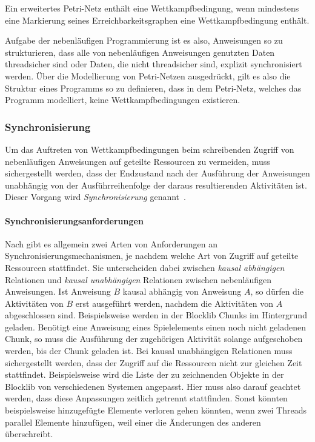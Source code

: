 Ein erweitertes Petri-Netz enthält eine Wettkampfbedingung, wenn mindestens eine Markierung seines Erreichbarkeitsgraphen eine Wettkampfbedingung enthält.

Aufgabe der nebenläufigen Programmierung ist es also, Anweisungen so zu strukturieren, dass alle von nebenläufigen Anweisungen genutzten Daten threadsicher sind oder Daten, die nicht threadsicher sind, explizit synchronisiert werden. Über die Modellierung von Petri-Netzen ausgedrückt, gilt es also die Struktur eines Programms so zu definieren, dass in dem Petri-Netz, welches das Programm modelliert, keine Wettkampfbedingungen existieren.

\subsubsection{Synchronisierung}
Um das Auftreten von Wettkampfbedingungen beim schreibenden Zugriff von nebenläufigen Anweisungen auf geteilte Ressourcen zu vermeiden, muss sichergestellt werden, dass der Endzustand nach der Ausführung der Anweisungen unabhängig von der Ausführreihenfolge der daraus resultierenden Aktivitäten ist. Dieser Vorgang wird \emph{Synchronisierung} genannt~\cite[S.~4]{Maurer2019}.

\paragraph{Synchronisierungsanforderungen} Nach \textcite[S.~132~ff.]{Herrtwich1989} gibt es allgemein zwei Arten von Anforderungen an Synchronisierungsmechanismen, je nachdem welche Art von Zugriff auf geteilte Ressourcen stattfindet. Sie unterscheiden dabei zwischen \emph{kausal abhängigen} Relationen und \emph{kausal unabhängigen} Relationen zwischen nebenläufigen Anweisungen. Ist Anweisung $B$ kausal abhängig von Anweisung $A$, so dürfen die Aktivitäten von $B$ erst ausgeführt werden, nachdem die Aktivitäten von $A$ abgeschlossen sind. Beispielsweise werden in der Blocklib Chunks im Hintergrund geladen. Benötigt eine Anweisung eines Spielelements einen noch nicht geladenen Chunk, so muss die Ausführung der zugehörigen Aktivität solange aufgeschoben werden, bis der Chunk geladen ist. Bei kausal unabhängigen Relationen muss sichergestellt werden, dass der Zugriff auf die Ressourcen nicht zur gleichen Zeit stattfindet.  Beispielsweise wird die Liste der zu zeichnenden Objekte in der Blocklib von verschiedenen Systemen angepasst. Hier muss also darauf geachtet werden, dass diese Anpassungen zeitlich getrennt stattfinden. Sonst könnten beispielsweise hinzugefügte Elemente verloren gehen könnten, wenn zwei Threads parallel Elemente hinzufügen, weil einer die Änderungen des anderen überschreibt.


